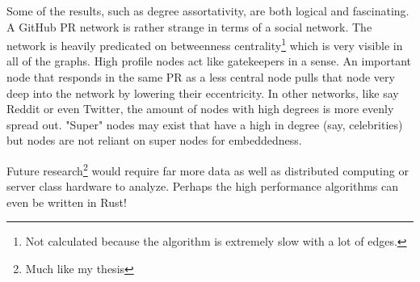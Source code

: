 \documentclass[12pt, a4paper]{article}
\begin{document}
Some of the results, such as degree assortativity, are both logical and fascinating. A GitHub PR network is rather strange in terms of a social network. The network is heavily predicated on betweenness centrality\footnote{Not calculated because the algorithm is extremely slow with a lot of edges.} which is very visible in all of the graphs. High profile nodes act like gatekeepers in a sense. An important node that responds in the same PR as a less central node pulls that node very deep into the network by lowering their eccentricity. In other networks, like say Reddit or even Twitter, the amount of nodes with high degrees is more evenly spread out. "Super" nodes may exist that have a high in degree (say, celebrities) but nodes are not reliant on super nodes for embeddedness.

Future research\footnote{Much like my thesis} would require far more data as well as distributed computing or server class hardware to analyze. Perhaps the high performance algorithms can even be written in Rust!

\printbibliography
\end{document}

